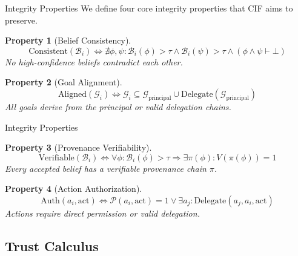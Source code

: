 \documentclass[
  ignorenonframetext,
]{beamer}
\newtheorem{property}{Property}
\begin{document}
\begin{frame}[allowframebreaks]{Integrity Properties}
We define four core integrity properties that CIF aims to preserve.

\begin{property}[Belief Consistency]
\label{prop:belief-consistency}
\begin{equation}
\label{eq:belief-consistency}
\text{Consistent}(\mathcal{B}_i) \iff \nexists \phi, \psi: \mathcal{B}_i(\phi) > \tau \land \mathcal{B}_i(\psi) > \tau \land (\phi \land \psi \vdash \bot)
\end{equation}
No high-confidence beliefs contradict each other.
\end{property}

\begin{property}[Goal Alignment]
\label{prop:goal-alignment}
\begin{equation}
\label{eq:goal-alignment}
\text{Aligned}(\mathcal{G}_i) \iff \mathcal{G}_i \subseteq \mathcal{G}_{\text{principal}} \cup \text{Delegate}(\mathcal{G}_{\text{principal}})
\end{equation}
All goals derive from the principal or valid delegation chains.
\end{property}

\end{frame}

\begin{frame}[allowframebreaks]{Integrity Properties}
\begin{property}[Provenance Verifiability]
\label{prop:provenance}
\begin{equation}
\label{eq:provenance}
\text{Verifiable}(\mathcal{B}_i) \iff \forall \phi: \mathcal{B}_i(\phi) > \tau \Rightarrow \exists \pi(\phi): V(\pi(\phi)) = 1
\end{equation}
Every accepted belief has a verifiable provenance chain $\pi$.
\end{property}

\begin{property}[Action Authorization]
\label{prop:authorization}
\begin{equation}
\label{eq:authorization}
\text{Auth}(a_i, \text{act}) \iff \mathcal{P}(a_i, \text{act}) = 1 \lor \exists a_j: \text{Delegate}(a_j, a_i, \text{act})
\end{equation}
Actions require direct permission or valid delegation.
\end{property}
\end{frame}

\subsection{Trust Calculus}\label{sec:trust-calculus}
\end{document}
